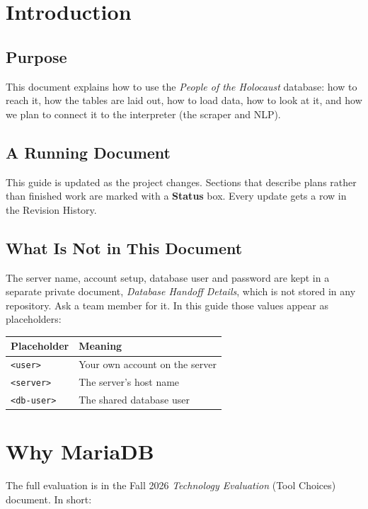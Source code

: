 \documentclass[11pt]{article}
\newcommand{\code}[1]{\texttt{#1}}
\begin{document}
\section{Introduction}

\subsection{Purpose}

This document explains how to use the \textit{People of the Holocaust}
database: how to reach it, how the tables are laid out, how to load data,
how to look at it, and how we plan to connect it to the interpreter (the
scraper and NLP).

\subsection{A Running Document}

This guide is updated as the project changes. Sections that describe plans
rather than finished work are marked with a \textbf{Status} box. Every
update gets a row in the Revision History.

\subsection{What Is Not in This Document}

The server name, account setup, database user and password are kept in a
separate private document, \textit{Database Handoff Details}, which is not
stored in any repository. Ask a team member for it. In this guide those
values appear as placeholders:

\begin{tabular}{|L{1.2in}|L{4.2in}|}
\hline
\textbf{Placeholder} & \textbf{Meaning} \\
\hline
\code{<user>} & Your own account on the server \\
\hline
\code{<server>} & The server's host name \\
\hline
\code{<db-user>} & The shared database user \\
\hline
\end{tabular}

\section{Why MariaDB}

The full evaluation is in the Fall 2026 \textit{Technology Evaluation}
(Tool Choices) document. In short:
\end{document}
